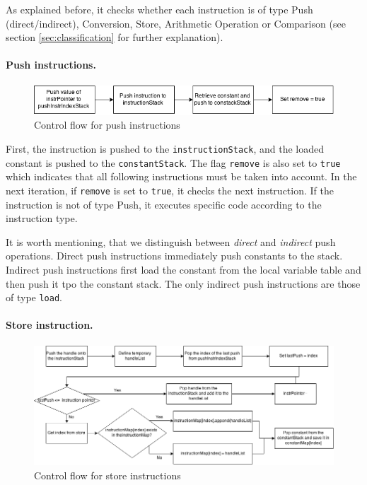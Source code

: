 As explained before, it checks whether each instruction is of type Push (direct/indirect), Conversion, Store, Arithmetic Operation or Comparison (see section \ref{sec:classification} for further explanation).
\clearpage
\paragraph{Push instructions.}
\begin{figure}[h!]
\centering
\includegraphics[scale=0.7]{figures/push}
\caption{Control flow for push instructions}
\end{figure}
First, the instruction is pushed to the \texttt{instructionStack}, and the loaded constant is pushed to the \texttt{constantStack}. The flag \texttt{remove} is also set to \texttt{true} which indicates that all following instructions must be taken into account.     
In the next iteration, if \texttt{remove} is set to \texttt{true}, it checks the next instruction. If the instruction is not of type Push, it executes specific code according to the instruction type.

It is worth mentioning, that we distinguish between \textit{direct} and \textit{indirect} push operations. Direct push instructions immediately push constants to the stack. Indirect push instructions first load the constant from the local variable table and then push it tpo the constant stack. The only indirect push instructions are those of type \texttt{load}.



\paragraph{Store instruction.}
\begin{figure}[h!]
\centering
\includegraphics[scale=0.5]{figures/store}
\caption{Control flow for store instructions}
\end{figure}

